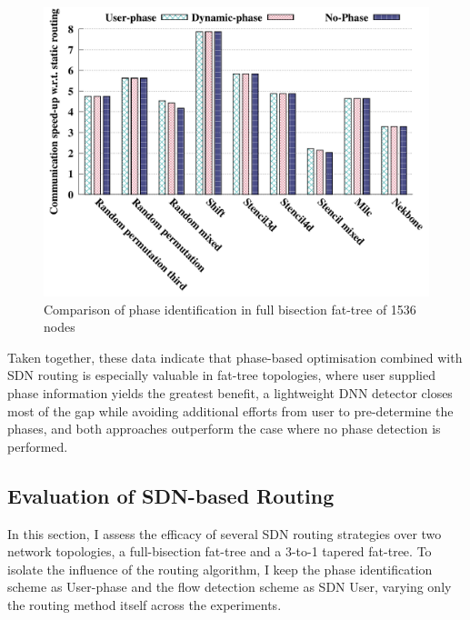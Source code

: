 \begin{figure}[h]
  \centering
  \includegraphics[width=\columnwidth]{./figs_4/phase_taper.pdf}
  \caption{Comparison of phase identification in full bisection fat-tree of 1536 nodes}
  \label{fig:phase_taper}
\end{figure}


Taken together, these data indicate that phase-based optimisation combined with SDN routing is especially valuable in fat-tree topologies, where user supplied phase information yields the greatest benefit, a lightweight DNN detector closes most of the gap while avoiding additional efforts from user to pre-determine the phases, and both approaches outperform the case where no phase detection is performed.

\subsection{Evaluation of SDN-based Routing}
In this section, I assess the efficacy of several SDN routing strategies over two network topologies, a full-bisection fat-tree and a 3-to-1 tapered fat-tree. To isolate the influence of the routing algorithm, I keep the phase identification scheme as User-phase and the flow detection scheme as SDN User, varying only the routing method itself across the experiments.

